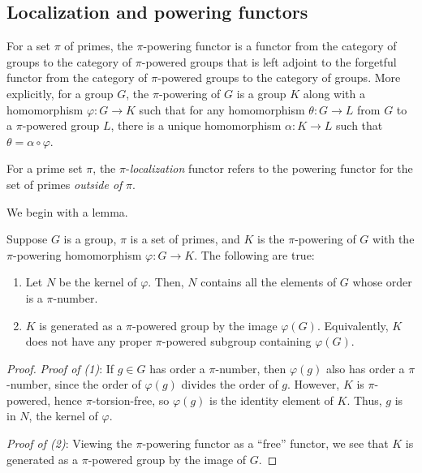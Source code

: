 \documentclass{ucetd}
\begin{document}
\subsection{Localization and powering functors}\label{sec:localization-and-powering-functors}

For a set $\pi$ of primes, the $\pi$-powering functor is a functor
from the category of groups to the category of $\pi$-powered groups
that is left adjoint to the forgetful functor from the category of
$\pi$-powered groups to the category of groups. More explicitly, for a
group $G$, the $\pi$-powering of $G$ is a group $K$ along with a
homomorphism $\varphi:G \to K$ such that for any homomorphism
$\theta:G \to L$ from $G$ to a $\pi$-powered group $L$, there is a
unique homomorphism $\alpha:K \to L$ such that $\theta = \alpha \circ
\varphi$.

For a prime set $\pi$, the $\pi$-{\em localization} functor refers to
the powering functor for the set of primes {\em outside of} $\pi$.

We begin with a lemma.

\begin{lemma}\label{lemma:pi-powering-arbitrary-group}
  Suppose $G$ is a group, $\pi$ is a set of primes, and $K$ is the
  $\pi$-powering of $G$ with the $\pi$-powering homomorphism
  $\varphi:G \to K$. The following are true:

  \begin{enumerate}
  \item Let $N$ be the kernel of $\varphi$. Then, $N$ contains all the
    elements of $G$ whose order is a $\pi$-number.
  \item $K$ is generated as a $\pi$-powered group by the image
    $\varphi(G)$. Equivalently, $K$ does not have any proper $\pi$-powered
    subgroup containing $\varphi(G)$.
  \end{enumerate}
\end{lemma}

\begin{proof}
  {\em Proof of (1)}: If $g \in G$ has order a $\pi$-number, then
  $\varphi(g)$ also has order a $\pi$-number, since the order of
  $\varphi(g)$ divides the order of $g$. However, $K$ is
  $\pi$-powered, hence $\pi$-torsion-free, so $\varphi(g)$ is the
  identity element of $K$. Thus, $g$ is in $N$, the kernel of
  $\varphi$.

  {\em Proof of (2)}: Viewing the $\pi$-powering functor as a ``free''
  functor, we see that $K$ is generated as a $\pi$-powered group by
  the image of $G$.
\end{proof}
\end{document}
